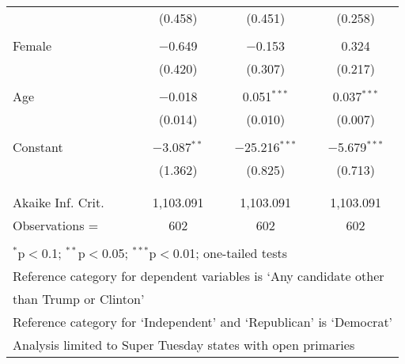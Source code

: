 \documentclass[12pt]{article}
\begin{document}
\begin{appendices}
\begin{refsection}
\begin{table}[!t]
\begin{adjustbox}{width=0.6\textwidth,center}
\begin{tabular}{@{\extracolsep{5pt}}lccc}
  & (0.458) & (0.451) & (0.258) \\ 
  & & & \\ 
 Female & $-$0.649 & $-$0.153 & 0.324 \\ 
  & (0.420) & (0.307) & (0.217) \\ 
  & & & \\ 
 Age & $-$0.018 & 0.051$^{***}$ & 0.037$^{***}$ \\ 
  & (0.014) & (0.010) & (0.007) \\ 
  & & & \\ 
 Constant & $-$3.087$^{**}$ & $-$25.216$^{***}$ & $-$5.679$^{***}$ \\ 
  & (1.362) & (0.825) & (0.713) \\ 
  & & & \\ 
\hline \\[-1.8ex] 
Akaike Inf. Crit. & 1,103.091 & 1,103.091 & 1,103.091 \\ 
Observations =  & 602 & 602 & 602 \\
\hline 
\hline \\[-1.8ex] 
\multicolumn{4}{l}{\footnotesize $^{*}$p$<$0.1; $^{**}$p$<$0.05; $^{***}$p$<$0.01; one-tailed tests} \\ 
\multicolumn{4}{l}{\footnotesize Reference category for dependent variables is `Any candidate other} \\
\multicolumn{4}{l}{\footnotesize than Trump or Clinton'} \\
\multicolumn{4}{l}{\footnotesize Reference category for `Independent' and `Republican' is `Democrat'} \\
\multicolumn{4}{l}{\footnotesize Analysis limited to Super Tuesday states with open primaries}
\end{tabular} 
\end{adjustbox}
\end{table}


\end{refsection}
\end{appendices}
\end{document}
